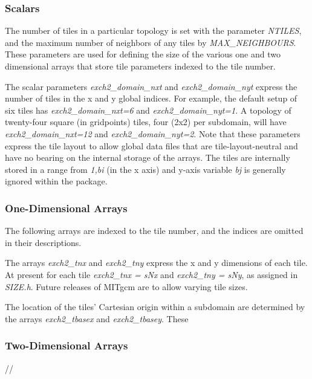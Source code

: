 \subsubsection{Scalars}

The number of tiles in a particular topology is set with the parameter
{\em NTILES}, and the maximum number of neighbors of any tiles by 
{\em MAX\_NEIGHBOURS}.  These parameters are used for defining the size of
the various one and two dimensional arrays that store tile parameters
indexed to the tile number.

The scalar parameters {\em exch2\_domain\_nxt} and 
{\em exch2\_domain\_nyt} express the number of tiles in the x and y global
indices.  For example, the default setup of six tiles has 
{\em exch2\_domain\_nxt=6} and {\em exch2\_domain\_nyt=1}.  A topology of
twenty-four square (in gridpoints) tiles, four (2x2) per subdomain, will
have {\em exch2\_domain\_nxt=12} and {\em exch2\_domain\_nyt=2}.  Note 
that these parameters express the tile layout to allow global data files that
are tile-layout-neutral and have no bearing on the internal storage of the
arrays.  The tiles are internally stored in a range from {\em 1,bi} (in the
x axis) and y-axis variable {\em bj} is generally ignored within the package.

\subsubsection{One-Dimensional Arrays}

The following arrays are indexed to the tile number, and the indices are
omitted in their descriptions.

The arrays {\em exch2\_tnx} and {\em exch2\_tny} 
express the x and y dimensions of each tile.  At present for each tile
{\em exch2\_tnx = sNx} 
and {\em exch2\_tny = sNy}, as assigned in {\em SIZE.h}.  Future releases of 
MITgcm are to allow varying tile sizes.

The location of the tiles' Cartesian origin within a subdomain are determined 
by the arrays {\em exch2\_tbasex} and {\em exch2\_tbasey}.  These

\subsubsection{Two-Dimensional Arrays}


//

